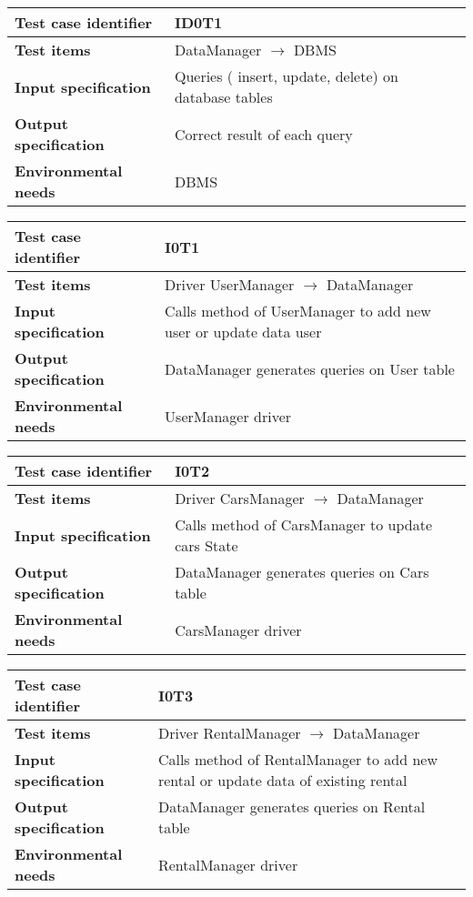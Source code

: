 \documentclass{scrreprt}
\begin{document}
\begin{center}
\begin{tabularx}{\columnwidth}{>{\bfseries}lX}
\toprule
Test case identifier & ID0T1\\
\midrule
Test items & DataManager $\longrightarrow$ DBMS\\
\midrule
Input specification & Queries ( insert, update, delete)  on database tables \\
\midrule
Output specification & Correct result of each query\\
\midrule
Environmental needs & DBMS\\
\bottomrule
\end{tabularx}
\end{center}


\begin{center}
\begin{tabularx}{\columnwidth}{>{\bfseries}lX}
\toprule
Test case identifier & I0T1\\
\midrule
Test items & Driver UserManager $\longrightarrow$ DataManager\\
\midrule
Input specification & Calls method of UserManager to add new user or update data user \\
\midrule
Output specification &  DataManager generates queries on User table \\
\midrule
Environmental needs & UserManager driver\\
\bottomrule
\end{tabularx}
\end{center}


\begin{center}
\begin{tabularx}{\columnwidth}{>{\bfseries}lX}
\toprule
Test case identifier &I0T2 \\
\midrule
Test items & Driver CarsManager $\longrightarrow$ DataManager\\
\midrule
Input specification & Calls method of CarsManager to update cars State \\
\midrule
Output specification &  DataManager generates queries on Cars table\\
\midrule
Environmental needs & CarsManager driver\\
\bottomrule
\end{tabularx}
\end{center}


\begin{center}
\begin{tabularx}{\columnwidth}{>{\bfseries}lX}
\toprule
Test case identifier & I0T3\\
\midrule
Test items & Driver RentalManager $\longrightarrow$ DataManager\\
\midrule
Input specification & Calls method of RentalManager to add new rental or update data of existing rental \\
\midrule
Output specification &  DataManager generates queries on Rental table \\
\midrule
Environmental needs & RentalManager driver\\
\bottomrule
\end{tabularx}
\end{center}
\end{document}
